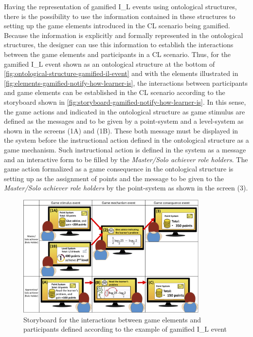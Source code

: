 Having the representation of gamified I\_L events using ontological structures, there is the possibility to use the information contained in these structures to setting up the game elements introduced in the CL scenario being gamified. Because the information is explicitly and formally represented in the ontological structures, the designer can use this information to establish the interactions between the game elements and participants in a CL scenario. Thus, for the gamified I\_L event  shown as an ontological structure at the bottom of \autoref{fig:ontological-structure-gamified-il-event} and with the elements illustrated in \autoref{fig:elements-gamified-notify-how-learner-is}, the interactions between participants and game elements can be established in the CL scenario according to the storyboard shown in \autoref{fig:storyboard-gamified-notify-how-learner-is}. In this sense, the game actions  and  indicated in the ontological structure as game stimulus are defined as the messages  and  to be given by a point-system and a level-system as shown in the screens (1A) and (1B). These both message must be displayed in the system before the instructional action  defined in the ontological structure as a game mechanism. Such instructional action is defined in the system as a message  and an interactive form to be filled by the \emph{Master/Solo achiever role holders}. The game action  formalized as a game consequence in the ontological structure is setting up as the assignment of points and the message to be given to the \emph{Master/Solo achiever role holders} by the point-system as shown in the screen (3).

\begin{figure}[!htbp]
 \caption{Storyboard for the interactions between game elements and participants defined according to the example of gamified I\_L event }
 \label{fig:storyboard-gamified-notify-how-learner-is}
 \centering
 \includegraphics[width=0.85\textwidth]{images/chap-ontogacles2/storyboard-gamified-notify-how-learner-is.png}
 \fautor
\end{figure}

